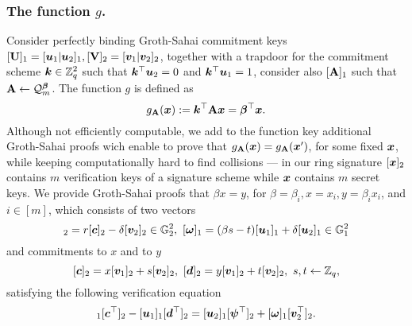 \subsubsection{The function $g$.} Consider perfectly binding Groth-Sahai commitment keys $[\mathbf{{U}}]_1=[{\boldsymbol{u}}_1|{\boldsymbol{u}}_2]_1,[\mathbf{{V}}]_2 = [{\boldsymbol{v}}_1|{\boldsymbol{v}}_2]_2$, together with a trapdoor for the commitment scheme ${\boldsymbol{k}}\in\mathbb{Z}_q^2$ such that ${\boldsymbol{k}}^\top{\boldsymbol{u}}_2=0$ and ${\boldsymbol{k}}^\top{\boldsymbol{u}}_1=1$, consider also $[\mathbf{{A}}]_1$ such that $\mathbf{{A}}\gets\mathcal{Q}_m^{\boldsymbol{\beta}}$. The function $g$ is defined as
$$
g_{\mathbf{{A}}}({\boldsymbol{x}}):= {\boldsymbol{k}}^\top\mathbf{{A}}{\boldsymbol{x}}={\boldsymbol{\beta}}^\top{\boldsymbol{x}}.
$$
Although not efficiently computable, we add to the function key additional Groth-Sahai proofs wich enable to prove that
 $g_{\mathbf{{A}}}({\boldsymbol{x}}) = g_{\mathbf{{A}}}({\boldsymbol{x}}')$, for some fixed ${\boldsymbol{x}}$, while keeping computationally hard to find collisions --- in our ring signature $[{\boldsymbol{x}}]_2$ contains $m$ verification keys of a signature scheme while ${\boldsymbol{x}}$ contains $m$ secret keys.
We provide Groth-Sahai proofs that $\beta x=y$, for $\beta=\beta_i,x=x_i,y=\beta_ix_i$, and $i\in[m]$, which consists of two vectors
\begin{equation}
[\vecb{\psi}]_2=r[\vecb{c}]_2-\delta[\vecb{v}_2]_2\in\GG_2^2,\ [\vecb{\omega}]_1 =(\beta s-t)[\vecb{u}_1]_1+\delta[\vecb{u}_2]_1\in\GG_1^2
\label{eq:wi-proofs}
\end{equation}
and commitments to $x$ and to $y$
$$
[{\boldsymbol{c}}]_2= x[{\boldsymbol{v}}_1]_2+s[{\boldsymbol{v}}_2]_2,\ [{\boldsymbol{d}}]_2 =y[{\boldsymbol{v}}_1]_2 + t[{\boldsymbol{v}}_2]_2,\ s,t\gets\mathbb{Z}_q,
$$
satisfying the following verification equation
\begin{equation}
[\vecb{a}]_1[\vecb{c}^\top]_2-[\vecb{u}_1]_1[\vecb{d}^\top]_2 =[\vecb{u}_2]_1[\vecb{\psi}^\top]_2+[\vecb{\omega}]_1[\vecb{v}^\top_2]_2.
\label{eq:wi-verif}
\end{equation}

